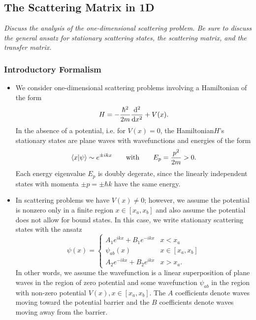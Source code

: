 \documentclass[11pt, a4paper]{article}
\newcommand{\Ham}{Hamiltonian\xspace}
\begin{document}
\subsection{The Scattering Matrix in 1D}
\textit{Discuss the analysis of the one-dimensional scattering problem. Be sure to discuss the general ansatz for stationary scattering states, the scattering matrix, and the transfer matrix.}

\subsubsection{Introductory Formalism}
\begin{itemize}
    \item We consider one-dimensional scattering problems involving a \Ham of the form
    \begin{equation*}
        H = - \frac{\hbar^{2}}{2m}\dv[2]{}{x} + V(x).
    \end{equation*}
    In the absence of a potential, i.e. for $ V(x) = 0 $, the \Ham $ H $'s stationary states are plane waves with wavefunctions and energies of the form
    \begin{equation*}
        \braket{x}{\psi} \sim e^{\pm i kx} \qquad \text{with} \qquad E_{p} = \frac{p^{2}}{2m} > 0.
    \end{equation*}
    Each energy eigenvalue $ E_{p} $ is doubly degerate, since the linearly independent states with momenta $ \pm p = \pm \hbar k $ have the same energy.

    \item In scattering problems we have $ V(x) \neq 0 $; however, we assume the potential is nonzero only in a finite region $ x \in [x_{a}, x_{b}] $ and also assume the potential does not allow for bound states. In this case, we write stationary scattering states with the ansatz
    \begin{equation*}
        \psi(x) = 
        \begin{cases}
            A_{1} e^{ikx} + B_{1} e^{-ikx} & x < x_{a}\\
            \psi_{ab}(x) & x \in [x_{a}, x_{b}]\\
            A_{2} e^{-ikx} + B_{2} e^{ikx} & x > x_{a}.
        \end{cases}
    \end{equation*}
    In other words, we assume the wavefunction is a linear superposition of plane waves in the region of zero potential and some wavefunction $ \psi_{ab} $ in the region with non-zero potential $ V(x), x \in [x_{a}, x_{b}] $. The $ A $ coefficients denote waves moving toward the potential barrier and the $ B $ coefficients denote waves moving away from the barrier.

\end{itemize}
\end{document}
